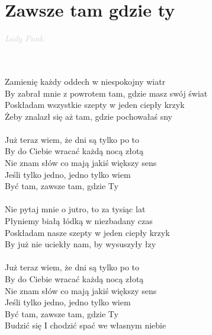 \documentclass[a5paper, 10pt]{book}
\begin{document}
\newpage
\section{Zawsze tam gdzie ty}\textcolor{lightgray}{\textit{Lady Pank}}\\~\\
\begin{minipage}[t]{0.7\textwidth}
~\\
Zamienię każdy oddech w niespokojny wiatr\\
By zabrał mnie z powrotem tam, gdzie masz swój świat\\
Poskładam wszystkie szepty w jeden ciepły krzyk\\
Żeby znalazł się aż tam, gdzie pochowałaś sny\\
\\
\hspace*{4mm}Już teraz wiem, że dni są tylko po to\\
\hspace*{4mm}By do Ciebie wracać każdą nocą złotą\\
\hspace*{4mm}Nie znam słów co mają jakiś większy sens\\
\hspace*{4mm}Jeśli tylko jedno, jedno tylko wiem\\
\hspace*{4mm}Być tam, zawsze tam, gdzie Ty\\
\\
Nie pytaj mnie o jutro, to za tysiąc lat\\
Płyniemy białą łódką w niezbadany czas\\
Poskładam nasze szepty w jeden ciepły krzyk\\
By już nie uciekły nam, by wysuszyły łzy\\
\\
\hspace*{4mm}Już teraz wiem, że dni są tylko po to\\
\hspace*{4mm}By do Ciebie wracać każdą nocą złotą\\
\hspace*{4mm}Nie znam słów co mają jakiś większy sens\\
\hspace*{4mm}Jeśli tylko jedno, jedno tylko wiem\\
\hspace*{4mm}Być tam, zawsze tam, gdzie Ty\\
\hspace*{4mm}Budzić się I chodzić spać we własnym niebie\\

\end{minipage}
\end{document}
